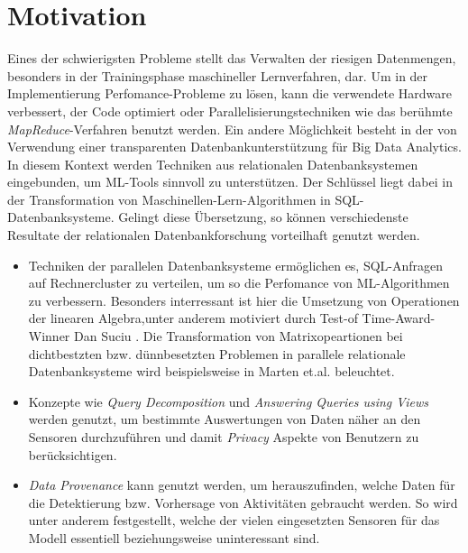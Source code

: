\section*{Motivation}
Eines der schwierigsten Probleme stellt das Verwalten der riesigen Datenmengen, besonders in der Trainingsphase maschineller Lernverfahren, dar. Um in der Implementierung Perfomance-Probleme zu lösen, kann die verwendete Hardware verbessert, der Code optimiert oder Parallelisierungstechniken wie das berühmte \textit{MapReduce}-Verfahren\cite{DBLP:journals/cn/BrinP98} benutzt werden. Ein andere Möglichkeit besteht in der von Verwendung einer transparenten Datenbankunterstützung\cite{DBLP:conf/gvd/MartenH15} für Big Data Analytics. In diesem Kontext werden Techniken aus relationalen Datenbanksystemen eingebunden, um ML-Tools sinnvoll zu unterstützen.
Der Schlüssel liegt dabei in der Transformation von Maschinellen-Lern-Algorithmen in SQL-Datenbanksysteme. Gelingt diese Übersetzung, so können verschiedenste Resultate der relationalen Datenbankforschung vorteilhaft genutzt werden.
\begin{itemize}
    \item Techniken der parallelen Datenbanksysteme ermöglichen es, SQL-Anfragen auf Rechnercluster zu verteilen, um so die Perfomance von ML-Algorithmen zu verbessern. Besonders interressant ist hier die Umsetzung von Operationen der linearen Algebra,unter anderem motiviert durch Test-of Time-Award-Winner Dan Suciu \cite{interviewsuciu}. Die Transformation von Matrixopeartionen bei dichtbestzten bzw. dünnbesetzten Problemen in parallele relationale Datenbanksysteme wird beispielsweise in Marten et.al.\cite{martensparse} beleuchtet.
    \item Konzepte wie \textit{Query Decomposition}\cite{chirkova2011materialized} und \textit{Answering Queries using Views}\cite{ afrati2019answering, levy1999answering} werden genutzt, um bestimmte Auswertungen von Daten näher an den Sensoren durchzuführen und damit \textit{Privacy}\cite{agrawal2000privacy} Aspekte von Benutzern zu berücksichtigen.
    \item \textit{Data Provenance} \cite{heuer2015metis, bruder2017konzepte} kann genutzt werden, um herauszufinden, welche Daten für die Detektierung bzw. Vorhersage von Aktivitäten gebraucht werden. 
    So wird unter anderem festgestellt, welche der vielen eingesetzten Sensoren für das Modell essentiell beziehungsweise uninteressant sind.
\end{itemize}

